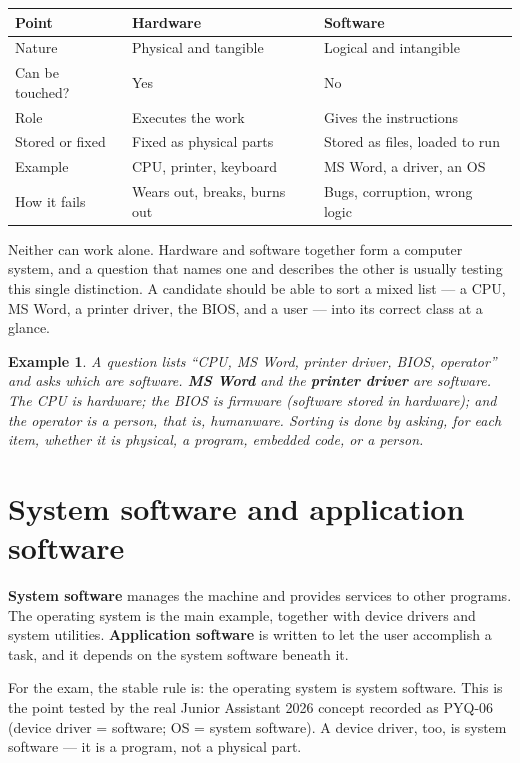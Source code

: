 \documentclass[11pt]{article}
\newtheorem{example}{Example}[section]
\begin{document}
\begin{center}
\begin{tabular}{p{}p{}p{}}
\toprule
\textbf{Point} & \textbf{Hardware} & \textbf{Software} \\
\midrule
Nature & Physical and tangible & Logical and intangible \\
Can be touched? & Yes & No \\
Role & Executes the work & Gives the instructions \\
Stored or fixed & Fixed as physical parts & Stored as files, loaded to run \\
Example & CPU, printer, keyboard & MS Word, a driver, an OS \\
How it fails & Wears out, breaks, burns out & Bugs, corruption, wrong logic \\
\bottomrule
\end{tabular}
\end{center}

Neither can work alone. Hardware and software together form a computer system,
and a question that names one and describes the other is usually testing this
single distinction. A candidate should be able to sort a mixed list --- a CPU,
MS Word, a printer driver, the BIOS, and a user --- into its correct class at a
glance.

\begin{example}
A question lists ``CPU, MS Word, printer driver, BIOS, operator'' and asks
which are software. \textbf{MS Word} and the \textbf{printer driver} are
software. The CPU is hardware; the BIOS is firmware (software stored in
hardware); and the operator is a person, that is, humanware. Sorting is done
by asking, for each item, whether it is physical, a program, embedded code, or
a person.
\end{example}

\section{System software and application software}
\textbf{System software} manages the machine and provides services to other
programs. The operating system is the main example, together with device
drivers and system utilities. \textbf{Application software} is written to let
the user accomplish a task, and it depends on the system software beneath it.

For the exam, the stable rule is: the operating system is system software.
This is the point tested by the real Junior Assistant 2026 concept recorded as
PYQ-06 (device driver = software; OS = system software). A device driver, too,
is system software --- it is a program, not a physical part.
\end{document}
